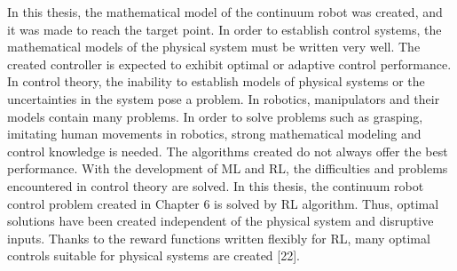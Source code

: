 \documentclass[12pt,twoside,a4]{mwbk}
\begin{document}
In this thesis, the mathematical model of the continuum robot was created, and it was made to reach the target point. In order to establish control systems, the mathematical models of the physical system must be written very well. The created controller is expected to exhibit optimal or adaptive control performance. In control theory, the inability to establish models of physical systems or the uncertainties in the system pose a problem. In robotics, manipulators and their models contain many problems. In order to solve problems such as grasping, imitating human movements in robotics, strong mathematical modeling and control knowledge is needed. The algorithms created do not always offer the best performance. With the development of ML and RL, the difficulties and problems encountered in control theory are solved. In this thesis, the continuum robot control problem created in Chapter 6 is solved by RL algorithm. Thus, optimal solutions have been created independent of the physical system and disruptive inputs. Thanks to the reward functions written flexibly for RL, many optimal controls suitable for physical systems are created [22].
\end{document}
